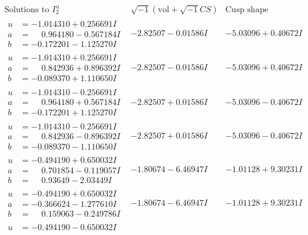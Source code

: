 \documentclass[1p]{elsarticle_modified}
\theoremstyle{definition}
\newcommand{\I}{\sqrt{-1}}
\begin{document}
$$\begin{array}{c|c|c}  
\text{Solutions to }I^u_{2}& \I (\text{vol} + \sqrt{-1}CS) & \text{Cusp shape}\\
 \hline 
\begin{aligned}
u &= -1.014310 + 0.256691 I \\
a &= \phantom{-}0.964180 - 0.567184 I \\
b &= -0.172201 - 1.125270 I\end{aligned}
 & -2.82507 - 0.01586 I & -5.03096 + 0.40672 I \\ \hline\begin{aligned}
u &= -1.014310 + 0.256691 I \\
a &= \phantom{-}0.842936 + 0.896392 I \\
b &= -0.089370 + 1.110650 I\end{aligned}
 & -2.82507 - 0.01586 I & -5.03096 + 0.40672 I \\ \hline\begin{aligned}
u &= -1.014310 - 0.256691 I \\
a &= \phantom{-}0.964180 + 0.567184 I \\
b &= -0.172201 + 1.125270 I\end{aligned}
 & -2.82507 + 0.01586 I & -5.03096 - 0.40672 I \\ \hline\begin{aligned}
u &= -1.014310 - 0.256691 I \\
a &= \phantom{-}0.842936 - 0.896392 I \\
b &= -0.089370 - 1.110650 I\end{aligned}
 & -2.82507 + 0.01586 I & -5.03096 - 0.40672 I \\ \hline\begin{aligned}
u &= -0.494190 + 0.650032 I \\
a &= \phantom{-}0.701854 - 0.119057 I \\
b &= \phantom{-}0.93649 - 2.03449 I\end{aligned}
 & -1.80674 - 6.46947 I & -1.01128 + 9.30231 I \\ \hline\begin{aligned}
u &= -0.494190 + 0.650032 I \\
a &= -0.366624 - 1.277610 I \\
b &= \phantom{-}0.159063 - 0.249786 I\end{aligned}
 & -1.80674 - 6.46947 I & -1.01128 + 9.30231 I \\ \hline\begin{aligned}
u &= -0.494190 - 0.650032 I \\

\end{aligned}
\end{array}$$
\end{document}
